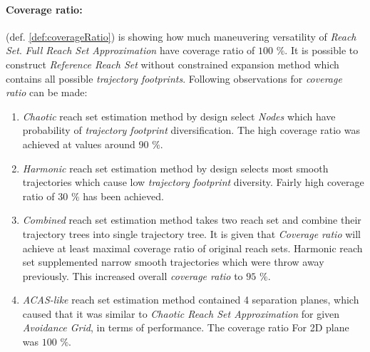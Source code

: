 \paragraph{Coverage ratio:} (def. \ref{def:coverageRatio}) is showing how much maneuvering versatility of \emph{Reach Set}. \emph{Full Reach Set Approximation} have coverage ratio of $100$ $\%$. It is possible to construct \emph{Reference Reach Set} without constrained expansion method which contains all possible \emph{trajectory footprints}. Following observations for \emph{coverage ratio} can be made:
\begin{enumerate}
    \item \emph{Chaotic} reach set estimation method by design select \emph{Nodes} which have probability of \emph{trajectory footprint} diversification. The high coverage ratio was achieved at values around 90 $\%$.
    
    \item \emph{Harmonic} reach set estimation method by design selects most smooth trajectories which cause low \emph{trajectory footprint} diversity. Fairly high coverage ratio of $30$ $\%$ has been achieved.
    
    \item \emph{Combined} reach set estimation method takes two reach set and combine their trajectory trees into single trajectory tree. It is given that \emph{Coverage ratio} will achieve at least maximal coverage ratio of original reach sets. Harmonic reach set supplemented narrow smooth trajectories which were throw away previously. This increased overall \emph{coverage ratio} to $95$ $\%$. 
    
    \item \emph{ACAS-like} reach set estimation method contained 4 separation planes, which caused that it was similar to \emph{Chaotic Reach Set Approximation} for given \emph{Avoidance Grid}, in terms of performance. The coverage ratio For 2D plane was $100$ $\%$.
\end{enumerate}

